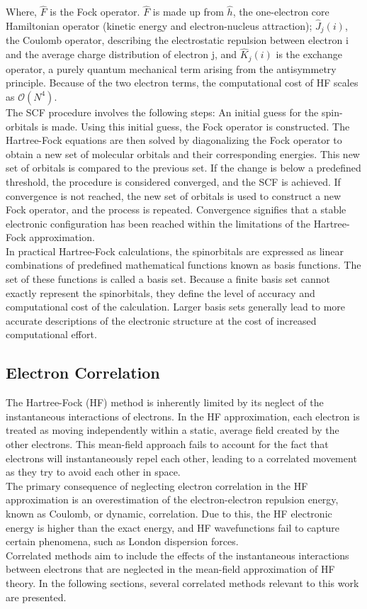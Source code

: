 Where, $\hat{F}$ is the Fock operator. $\hat{F}$ is made up from $\hat{h}$, the one-electron core Hamiltonian operator (kinetic energy and electron-nucleus attraction); $\hat{J}_j(i)$, the Coulomb operator, describing the electrostatic repulsion between electron i and the average charge distribution of electron j, and $\hat{K}_j(i)$ is the exchange operator, a purely quantum mechanical term arising from the antisymmetry principle. Because of the two electron terms, the computational cost of HF scales as $\mathcal{O}(N^4)$. \\
The SCF procedure involves the following steps: An initial guess for the spin-orbitals is made. Using this initial guess, the Fock operator is constructed. The Hartree-Fock equations are then solved by diagonalizing the Fock operator to obtain a new set of molecular orbitals and their corresponding energies. This new set of orbitals is compared to the previous set. If the change is below a predefined threshold, the procedure is considered converged, and the SCF is achieved. If convergence is not reached, the new set of orbitals is used to construct a new Fock operator, and the process is repeated. Convergence signifies that a stable electronic configuration has been reached within the limitations of the Hartree-Fock approximation.\\ \fi
In practical Hartree-Fock calculations, the spinorbitals are expressed as linear combinations of predefined mathematical functions known as basis functions. The set of these functions is called a basis set. Because a finite basis set cannot exactly represent the spinorbitals, they define the level of accuracy and computational cost of the calculation. Larger basis sets generally lead to more accurate descriptions of the electronic structure at the cost of increased computational effort.

\subsection{Electron Correlation}
\label{subsec:electron_correlation}
The Hartree-Fock (HF) method is inherently limited by its neglect of the instantaneous interactions of electrons. In the HF approximation, each electron is treated as moving independently within a static, average field created by the other electrons. This mean-field approach fails to account for the fact that electrons will instantaneously repel each other, leading to a correlated movement as they try to avoid each other in space.\\
The primary consequence of neglecting electron correlation in the HF approximation is an overestimation of the electron-electron repulsion energy, known as Coulomb, or dynamic, correlation. Due to this, the HF electronic energy is higher than the exact energy, and HF wavefunctions fail to capture certain phenomena, such as London dispersion forces.\\
Correlated methods aim to include the effects of the instantaneous interactions between electrons that are neglected in the mean-field approximation of HF theory. In the following sections, several correlated methods relevant to this work are presented.


